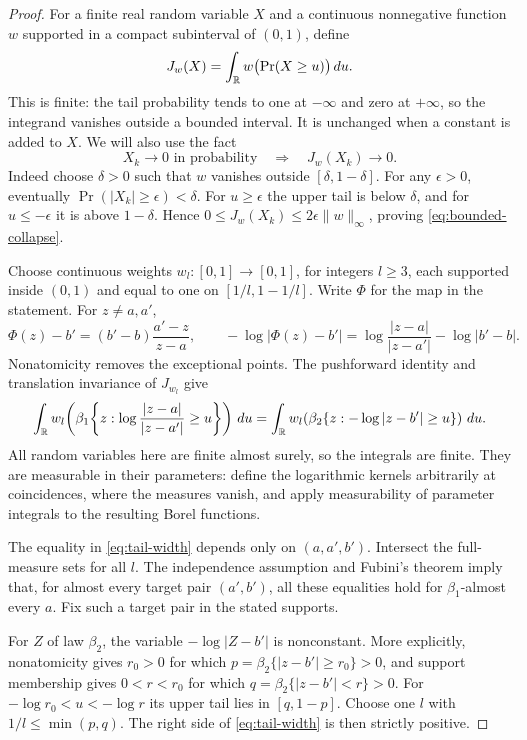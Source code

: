 \begin{proof}
For a finite real random variable $X$ and a continuous nonnegative
function $w$ supported in a compact subinterval of $(0,1)$, define
\[
 J_w(X)=\int_\mathbb R w\bigl(\Pr(X\ge u)\bigr)\,du.
\]
This is finite: the tail probability tends to one at $-\infty$ and
zero at $+\infty$, so the integrand vanishes outside a bounded interval.
It is unchanged when a constant is added to $X$.
We will also use the fact
\begin{equation}\label{eq:bounded-collapse}
 X_k\longrightarrow0\text{ in probability}
 \quad\Longrightarrow\quad J_w(X_k)\longrightarrow0.
\end{equation}
Indeed choose $\delta>0$ such that $w$ vanishes outside
$[\delta,1-\delta]$.  For any $\epsilon>0$, eventually
$\Pr(|X_k|\ge\epsilon)<\delta$.
For $u\ge\epsilon$ the upper tail is below $\delta$, and for
$u\le-\epsilon$ it is above $1-\delta$.  Hence
$0\le J_w(X_k)\le2\epsilon\|w\|_\infty$, proving
\eqref{eq:bounded-collapse}.

Choose continuous weights $w_l:[0,1]\to[0,1]$, for integers $l\ge3$,
each supported inside $(0,1)$ and equal to one on
$[1/l,1-1/l]$.  Write $\Phi$ for the map in the statement.
For $z\ne a,a'$,
\[
 \Phi(z)-b'=(b'-b)\frac{a'-z}{z-a},
 \qquad
 -\log|\Phi(z)-b'|
 =\log\frac{|z-a|}{|z-a'|}-\log|b'-b|.
\]
Nonatomicity removes the exceptional points.  The pushforward
identity and translation invariance of $J_{w_l}$ give
\begin{equation}\label{eq:tail-width}
 \int_\mathbb R w_l\!\left(
   \beta_1\!\left\{z:\log\frac{|z-a|}{|z-a'|}\ge u\right\}\right)\,du
 =
 \int_\mathbb R w_l\!\left(
   \beta_2\{z:-\log|z-b'|\ge u\}\right)\,du .
\end{equation}
All random variables here are finite almost surely, so the integrals
are finite.  They are measurable in their parameters: define the
logarithmic kernels arbitrarily at coincidences, where the measures
vanish, and apply measurability of parameter integrals to the resulting
Borel functions.

The equality in \eqref{eq:tail-width} depends only on $(a,a',b')$.
Intersect the full-measure sets for all $l$.  The independence
assumption and Fubini's theorem imply that, for almost every target
pair $(a',b')$, all these equalities hold for $\beta_1$-almost every
$a$.  Fix such a target pair in the stated supports.

For $Z$ of law $\beta_2$, the variable $-\log|Z-b'|$ is nonconstant.
More explicitly, nonatomicity gives $r_0>0$ for which
$p=\beta_2\{|z-b'|\ge r_0\}>0$, and support membership gives
$0<r<r_0$ for which $q=\beta_2\{|z-b'|<r\}>0$.
For $-\log r_0<u<-\log r$ its upper tail lies in $[q,1-p]$.
Choose one $l$ with $1/l\le\min(p,q)$.
The right side of \eqref{eq:tail-width} is then strictly positive.


\end{proof}
